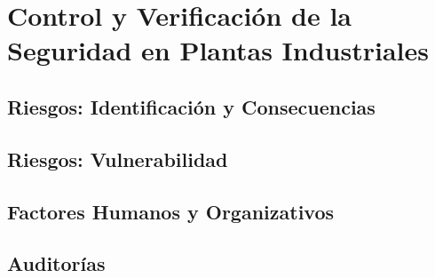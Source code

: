 \chapter{Control y Verificación de la Seguridad en Plantas Industriales}

\section{Riesgos: Identificación y Consecuencias}

\section{Riesgos: Vulnerabilidad}

\section{Factores Humanos y Organizativos}

\section{Auditorías}
